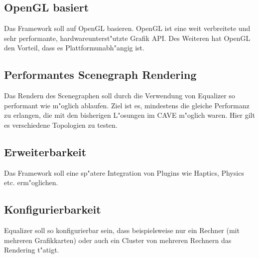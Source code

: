 \subsection{OpenGL basiert}
Das Framework soll auf OpenGL basieren. OpenGL ist eine weit verbreitete und sehr performante, hardwareunterst"utzte Grafik API. Des Weiteren hat OpenGL den Vorteil, dass es Plattformunabh"angig ist.


\subsection{Performantes Scenegraph Rendering}
Das Rendern des Scenegraphen soll durch die Verwendung von Equalizer so performant wie m"oglich ablaufen. Ziel ist es, mindestens die gleiche Performanz zu erlangen, die mit den bisherigen L"osungen im CAVE m"oglich waren. Hier gilt es verschiedene Topologien zu testen.

\subsection{Erweiterbarkeit}
Das Framework soll eine sp"atere Integration von Plugins wie Haptics, Physics etc. erm"oglichen.

\subsection{Konfigurierbarkeit}
Equalizer soll so konfigurierbar sein, dass beispielsweise nur ein Rechner (mit mehreren Grafikkarten) oder auch ein Cluster von mehreren Rechnern das Rendering t"atigt.
